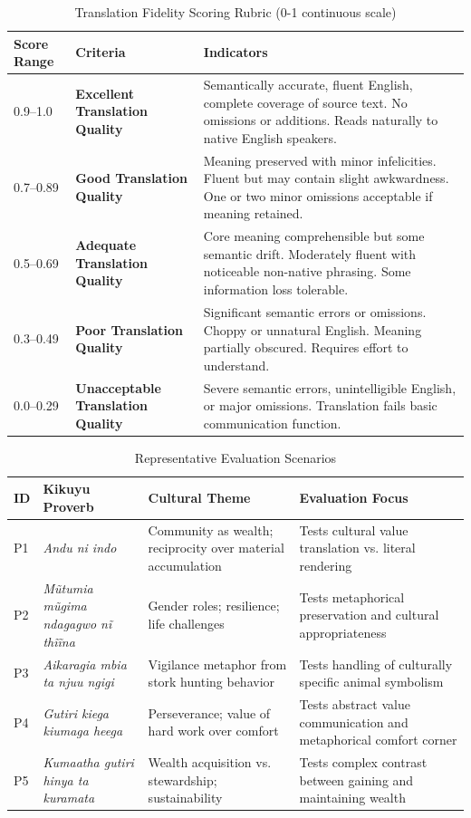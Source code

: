 \begin{table}[p]
\centering
\small
\begin{tabular}{p{1.5cm}p{5cm}p{6cm}}
\hline
\textbf{Score Range} & \textbf{Criteria} & \textbf{Indicators} \\
\hline
0.9--1.0 & \textbf{Excellent Translation Quality} & Semantically accurate, fluent English, complete coverage of source text. No omissions or additions. Reads naturally to native English speakers. \\
\hline
0.7--0.89 & \textbf{Good Translation Quality} & Meaning preserved with minor infelicities. Fluent but may contain slight awkwardness. One or two minor omissions acceptable if meaning retained. \\
\hline
0.5--0.69 & \textbf{Adequate Translation Quality} & Core meaning comprehensible but some semantic drift. Moderately fluent with noticeable non-native phrasing. Some information loss tolerable. \\
\hline
0.3--0.49 & \textbf{Poor Translation Quality} & Significant semantic errors or omissions. Choppy or unnatural English. Meaning partially obscured. Requires effort to understand. \\
\hline
0.0--0.29 & \textbf{Unacceptable Translation Quality} & Severe semantic errors, unintelligible English, or major omissions. Translation fails basic communication function. \\
\hline
\end{tabular}
\caption{Translation Fidelity Scoring Rubric (0-1 continuous scale)}
\label{tab:fidelity_rubric}
\end{table}

\begin{table}[p]
\centering
\small
\begin{tabular}{p{0.5cm}p{4cm}p{5cm}p{3cm}}
\hline
\textbf{ID} & \textbf{Kikuyu Proverb} & \textbf{Cultural Theme} & \textbf{Evaluation Focus} \\
\hline
P1 & \emph{Andu ni indo} & Community as wealth; reciprocity over material accumulation & Tests cultural value translation vs. literal rendering \\
\hline
P2 & \emph{Mũtumia mũgima ndagagwo nĩ thĩĩna} & Gender roles; resilience; life challenges & Tests metaphorical preservation and cultural appropriateness \\
\hline
P3 & \emph{Aikaragia mbia ta njuu ngigi} & Vigilance metaphor from stork hunting behavior & Tests handling of culturally specific animal symbolism \\
\hline
P4 & \emph{Gutiri kiega kiumaga heega} & Perseverance; value of hard work over comfort & Tests abstract value communication and metaphorical comfort corner \\
\hline
P5 & \emph{Kumaatha gutiri hinya ta kuramata} & Wealth acquisition vs. stewardship; sustainability & Tests complex contrast between gaining and maintaining wealth \\
\hline
\end{tabular}
\caption{Representative Evaluation Scenarios}
\label{tab:eval_scenarios}
\end{table}

